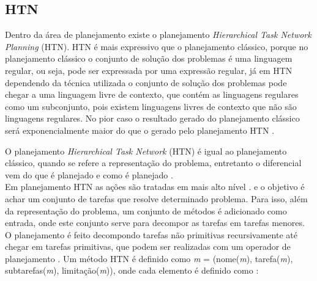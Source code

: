 

\subsection{HTN} 


Dentro da área de planejamento existe o planejamento \textit{Hierarchical Task Network Planning} (HTN). HTN é mais expressivo que o planejamento clássico, porque no planejamento clássico o conjunto de solução dos problemas é uma linguagem regular, ou seja, pode ser expressada por uma expressão regular, já em HTN dependendo da técnica utilizada o conjunto de solução dos problemas pode chegar a uma linguagem livre de contexto, que contém as linguagens regulares como um subconjunto, pois existem linguagens livres de contexto que não são linguagens regulares. No pior caso o resultado gerado do planejamento clássico será exponencialmente maior do que o gerado pelo planejamento HTN \cite{ghallab2004automated}.  \\ 

O planejamento \textit{Hierarchical Task Network} (HTN) é igual ao planejamento clássico, quando se refere a representação do problema, entretanto o diferencial vem do que é planejado e como é planejado \cite{ghallab2004automated}. \\

Em planejamento HTN as ações são tratadas em mais alto nível \cite{intelligence2003modern}. e o objetivo é achar um conjunto de tarefas que resolve determinado problema. Para isso, além da representação do problema, um conjunto de métodos é adicionado como entrada, onde este conjunto serve para decompor as tarefas em tarefas menores. O planejamento é feito decompondo tarefas não primitivas recursivamente até chegar em tarefas primitivas, que podem ser realizadas com um operador de planejamento \cite{ghallab2004automated}. Um método HTN é definido como \textit{m} = (nome(\textit{m}), tarefa(\textit{m}), subtarefas(\textit{m}), limitação(\textit{m})), onde cada elemento é definido como \cite{ghallab2004automated}: 
 
